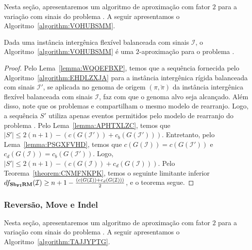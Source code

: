 Nesta seção, apresentaremos um algoritmo de aproximação com fator $2$ para a variação com sinais do problema \SbFIRM{}. A seguir apresentamos o Algoritmo~\ref{algorithm:VOHUBSMM}.



\begin{theorem}\label{theorem:NBFXUXJG}
Dada uma instância intergênica flexível balanceada com sinais $\mathcal{I}$, o Algoritmo~\ref{algorithm:VOHUBSMM} é uma $2$-aproximação para o problema \SbFIRM{}.
\end{theorem}
\begin{proof}
Pelo Lema~\ref{lemma:WQOEFBXP}, temos que a sequência fornecida pelo Algoritmo~\ref{algorithm:EHDLZXJA} para a instância intergênica rígida balanceada com sinais $\mathcal{I'}$, se aplicada no genoma de origem $(\pi,\breve\pi)$ da instância intergênica flexível balanceada com sinais $\mathcal{I}$, faz com que o genoma alvo seja alcançado. Além disso, note que os problemas \SbIRM{} e \SbFIRM{} compartilham o mesmo modelo de rearranjo. Logo, a sequência $S'$ utiliza apenas eventos permitidos pelo modelo de rearranjo do problema \SbFIRM{}. Pelo Lema~\ref{lemma:APHTXLZC}, temos que $|S'| \le 2(n + 1) - (c(G(\mathcal{I}')) + c_b(G(\mathcal{I}')))$. Entretanto, pelo Lema~\ref{lemma:PSGXFVHD}, temos que $c(G(\mathcal{I})) = c(G(\mathcal{I}'))$ e $c_d(G(\mathcal{I})) = c_b(G(\mathcal{I}'))$. Logo, $|S'| \le 2(n + 1) - (c(G(\mathcal{I})) + c_d(G(\mathcal{I})))$. Pelo Teorema~\ref{theorem:CNMFNKPK}, temos o seguinte limitante inferior $df_{\textbf{Sb\textsubscript{FI}RM}}(\mathcal{I}) \ge {n+1} - \frac{(c(G(\mathcal{I})) + c_d(G(\mathcal{I})))}{2}$, e o teorema segue.
\end{proof}

\subsubsection{Reversão, Move e Indel}

Nesta seção, apresentaremos um algoritmo de aproximação com fator $2$ para a variação com sinais do problema \SbFIRMI{}. A seguir apresentamos o Algoritmo~\ref{algorithm:TAJJYPTG}.



